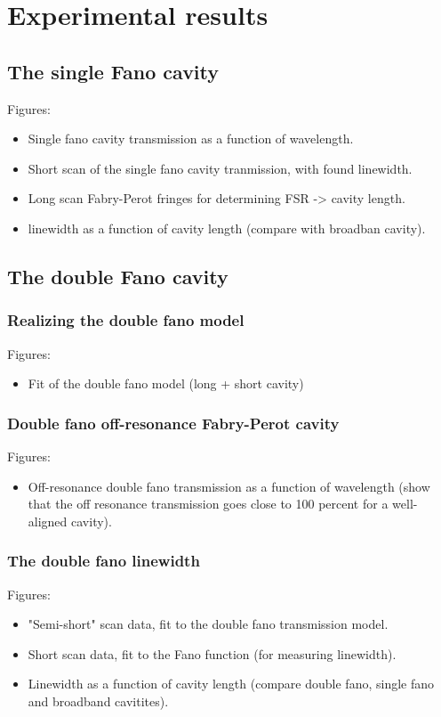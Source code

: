 \section{Experimental results}

\subsection{The single Fano cavity}

Figures:
\begin{itemize}
    \item Single fano cavity transmission as a function of wavelength.
    \item Short scan of the single fano cavity tranmission, with found linewidth.
    \item Long scan Fabry-Perot fringes for determining FSR -> cavity length. 
    \item linewidth as a function of cavity length (compare with broadban cavity).
\end{itemize}

\subsection{The double Fano cavity}

\subsubsection{Realizing the double fano model}

Figures: 
\begin{itemize}
    \item Fit of the double fano model (long + short cavity)
\end{itemize}

\subsubsection{Double fano off-resonance Fabry-Perot cavity}

Figures:
\begin{itemize}
    \item Off-resonance double fano transmission as a function of wavelength (show that the off resonance transmission goes close to 100 percent for a well-aligned cavity).
\end{itemize}

\subsubsection{The double fano linewidth}

Figures: 
\begin{itemize}
    \item "Semi-short" scan data, fit to the double fano transmission model. 
    \item Short scan data, fit to the Fano function (for measuring linewidth).
    \item Linewidth as a function of cavity length (compare double fano, single fano and broadband cavitites).
\end{itemize}

